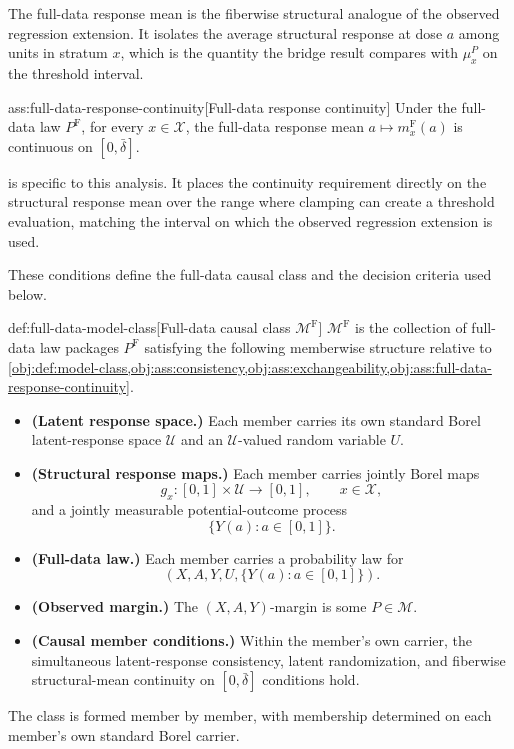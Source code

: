 \documentclass[11pt]{article}
\begin{document}
The full-data response mean  is the fiberwise structural analogue of the observed regression extension. It isolates the average structural response at dose \(a\) among units in stratum \(x\), which is the quantity the bridge result compares with \(\mu_x^P\) on the threshold interval.

\begin{assumptionv}{ass:full-data-response-continuity}[Full-data response continuity]
Under the full-data law \(P^{\mathrm F}\), for every \(x\in\mathcal X\), the full-data response mean \(a\mapsto m_x^{\mathrm F}(a)\) is continuous on \([0,\bar\delta]\).
\end{assumptionv}

 is specific to this analysis. It places the continuity requirement directly on the structural response mean over the range where clamping can create a threshold evaluation, matching the interval on which the observed regression extension is used.

These conditions define the full-data causal class and the decision criteria used below.

\begin{definitionv}{def:full-data-model-class}[Full-data causal class \(\mathcal M^{\mathrm F}\)]
\(\mathcal M^{\mathrm F}\) is the collection of full-data law packages \(P^{\mathrm F}\) satisfying the following memberwise structure relative to \cref{obj:def:model-class,obj:ass:consistency,obj:ass:exchangeability,obj:ass:full-data-response-continuity}.
\begin{itemize}
\item \textbf{(Latent response space.)} Each member carries its own standard Borel latent-response space \(\mathcal U\) and an \(\mathcal U\)-valued random variable \(U\).
\item \textbf{(Structural response maps.)} Each member carries jointly Borel maps
\[
g_x:[0,1]\times\mathcal U\to[0,1],
\qquad x\in\mathcal X,
\]
and a jointly measurable potential-outcome process
\[
\{Y(a):a\in[0,1]\}.
\]
\item \textbf{(Full-data law.)} Each member carries a probability law for
\[
(X,A,Y,U,\{Y(a):a\in[0,1]\}).
\]
\item \textbf{(Observed margin.)} The \((X,A,Y)\)-margin is some \(P\in\mathcal M\).
\item \textbf{(Causal member conditions.)} Within the member's own carrier, the simultaneous latent-response consistency, latent randomization, and fiberwise structural-mean continuity on \([0,\bar\delta]\) conditions hold.
\end{itemize}
The class is formed member by member, with membership determined on each member's own standard Borel carrier.
\end{definitionv}
\end{document}
